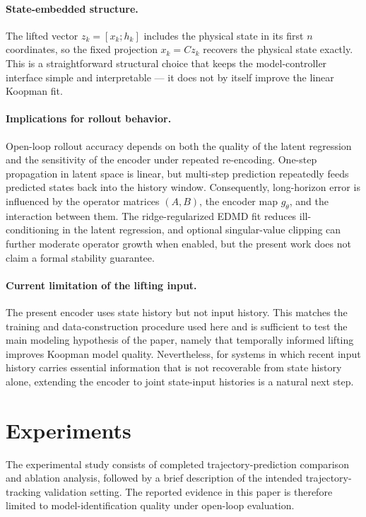 \documentclass[journal]{IEEEtran}
\begin{document}
\paragraph{State-embedded structure.}
The lifted vector $z_k=[x_k;h_k]$ includes the physical state in its first $n$ coordinates, so the fixed projection $x_k=Cz_k$ recovers the physical state exactly. This is a straightforward structural choice that keeps the model-controller interface simple and interpretable — it does not by itself improve the linear Koopman fit.

\paragraph{Implications for rollout behavior.}
Open-loop rollout accuracy depends on both the quality of the latent regression and the sensitivity of the encoder under repeated re-encoding. One-step propagation in latent space is linear, but multi-step prediction repeatedly feeds predicted states back into the history window. Consequently, long-horizon error is influenced by the operator matrices $(A,B)$, the encoder map $g_\theta$, and the interaction between them. The ridge-regularized EDMD fit reduces ill-conditioning in the latent regression, and optional singular-value clipping can further moderate operator growth when enabled, but the present work does not claim a formal stability guarantee.

\paragraph{Current limitation of the lifting input.}
The present encoder uses state history but not input history. This matches the training and data-construction procedure used here and is sufficient to test the main modeling hypothesis of the paper, namely that temporally informed lifting improves Koopman model quality. Nevertheless, for systems in which recent input history carries essential information that is not recoverable from state history alone, extending the encoder to joint state-input histories is a natural next step.

\section{Experiments}
\label{sec:experiments}

The experimental study consists of completed trajectory-prediction comparison and ablation analysis, followed by a brief description of the intended trajectory-tracking validation setting. The reported evidence in this paper is therefore limited to model-identification quality under open-loop evaluation.
\end{document}
